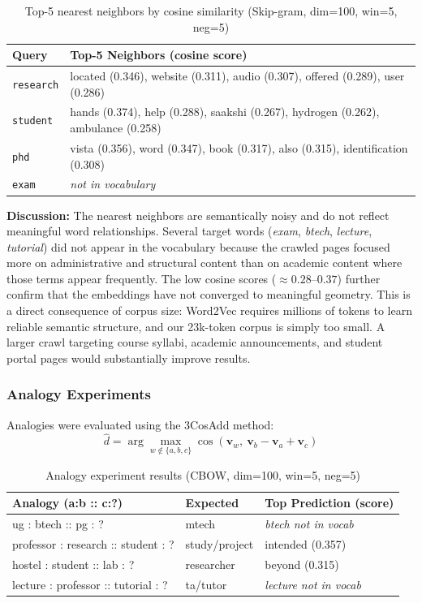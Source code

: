 \documentclass[11pt, a4paper]{article}
\begin{document}
\begin{table}[H]
\centering
\caption{Top-5 nearest neighbors by cosine similarity (Skip-gram, dim=100, win=5, neg=5)}
\begin{tabular}{lp{}}
\toprule
\textbf{Query} & \textbf{Top-5 Neighbors (cosine score)} \\
\midrule
\texttt{research}  & located (0.346), website (0.311), audio (0.307), offered (0.289), user (0.286) \\
\texttt{student}   & hands (0.374), help (0.288), saakshi (0.267), hydrogen (0.262), ambulance (0.258) \\
\texttt{phd}       & vista (0.356), word (0.347), book (0.317), also (0.315), identification (0.308) \\
\texttt{exam}      & \textit{not in vocabulary} \\
\bottomrule
\end{tabular}
\end{table}

\textbf{Discussion:} The nearest neighbors are semantically noisy and do not reflect meaningful word relationships. Several target words (\textit{exam}, \textit{btech}, \textit{lecture}, \textit{tutorial}) did not appear in the vocabulary because the crawled pages focused more on administrative and structural content than on academic content where those terms appear frequently. The low cosine scores ($\approx 0.28$--$0.37$) further confirm that the embeddings have not converged to meaningful geometry. This is a direct consequence of corpus size: Word2Vec requires millions of tokens to learn reliable semantic structure, and our 23k-token corpus is simply too small. A larger crawl targeting course syllabi, academic announcements, and student portal pages would substantially improve results.

\subsubsection{Analogy Experiments}

Analogies were evaluated using the 3CosAdd method:
\begin{equation}
\hat{d} = \arg\max_{w \notin \{a,b,c\}} \cos\left(\mathbf{v}_w,\ \mathbf{v}_b - \mathbf{v}_a + \mathbf{v}_c\right)
\end{equation}

\begin{table}[H]
\centering
\caption{Analogy experiment results (CBOW, dim=100, win=5, neg=5)}
\begin{tabular}{lll}
\toprule
\textbf{Analogy (a:b :: c:?)} & \textbf{Expected} & \textbf{Top Prediction (score)} \\
\midrule
ug : btech :: pg : ?         & mtech      & \textit{btech not in vocab} \\
professor : research :: student : ? & study/project & intended (0.357) \\
hostel : student :: lab : ?  & researcher & beyond (0.315) \\
lecture : professor :: tutorial : ? & ta/tutor & \textit{lecture not in vocab} \\
\bottomrule
\end{tabular}
\end{table}
\end{document}
